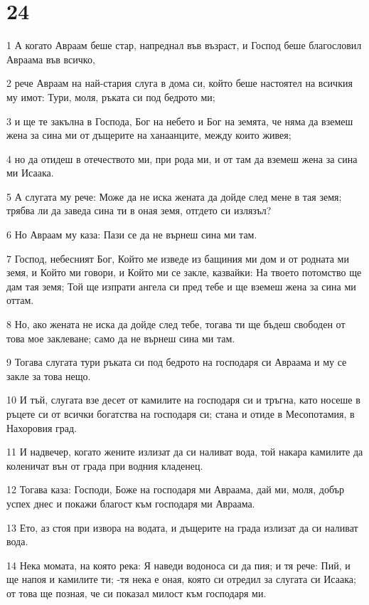 \chapter{24}

\par 1 А когато Авраам беше стар, напреднал във възраст, и Господ беше благословил Авраама във всичко,
\par 2 рече Авраам на най-стария слуга в дома си, който беше настоятел на всичкия му имот: Тури, моля, ръката си под бедрото ми;
\par 3 и ще те закълна в Господа, Бог на небето и Бог на земята, че няма да вземеш жена за сина ми от дъщерите на ханаанците, между които живея;
\par 4 но да отидеш в отечеството ми, при рода ми, и от там да вземеш жена за сина ми Исаака.
\par 5 А слугата му рече: Може да не иска жената да дойде след мене в тая земя; трябва ли да заведа сина ти в оная земя, отгдето си излязъл?
\par 6 Но Авраам му каза: Пази се да не върнеш сина ми там.
\par 7 Господ, небесният Бог, Който ме изведе из бащиния ми дом и от родната ми земя, и Който ми говори, и Който ми се закле, казвайки: На твоето потомство ще дам тая земя; Той ще изпрати ангела си пред тебе и ще вземеш жена за сина ми оттам.
\par 8 Но, ако жената не иска да дойде след тебе, тогава ти ще бъдеш свободен от това мое заклеване; само да не върнеш сина ми там.
\par 9 Тогава слугата тури ръката си под бедрото на господаря си Авраама и му се закле за това нещо.
\par 10 И тъй, слугата взе десет от камилите на господаря си и тръгна, като носеше в ръцете си от всички богатства на господаря си; стана и отиде в Месопотамия, в Нахоровия град.
\par 11 И надвечер, когато жените излизат да си наливат вода, той накара камилите да коленичат вън от града при водния кладенец.
\par 12 Тогава каза: Господи, Боже на господаря ми Авраама, дай ми, моля, добър успех днес и покажи благост към господаря ми Авраама.
\par 13 Ето, аз стоя при извора на водата, и дъщерите на града излизат да си наливат вода.
\par 14 Нека момата, на която река: Я наведи водоноса си да пия; и тя рече: Пий, и ще напоя и камилите ти; -тя нека е оная, която си отредил за слугата си Исаака; от това ще позная, че си показал милост към господаря ми.
